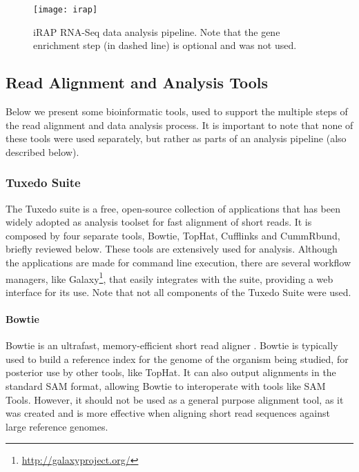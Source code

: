 \begin{figure}[!htb]
  \begin{center}
    \leavevmode
    \texttt{[image: irap]}
    \caption[iRAP RNA-Seq data analysis pipeline]{
      iRAP RNA-Seq data analysis pipeline. Note that the gene enrichment step
      (in dashed line) is optional and was not used.
    }
    \label{fig:irap}
  \end{center}
\end{figure}

\subsection{\rnaseq{} Read Alignment and Analysis Tools}

Below we present some bioinformatic tools, used to support the multiple steps of
the \rnaseq{} read alignment and data analysis process. It is important to note that none of these
tools were used separately, but rather as parts of an analysis pipeline (also
described below).

\subsubsection*{Tuxedo Suite}

The Tuxedo suite is a free, open-source collection of applications that has been
widely adopted as analysis toolset for fast alignment of short reads. It is
composed by four separate tools, Bowtie, TopHat, Cufflinks and CummRbund,
briefly reviewed below. These tools are extensively used for \rnaseq{} analysis.
Although the applications are made for command line execution, there are several
workflow managers, like Galaxy\footnote{\url{http://galaxyproject.org/}}, that
easily integrates with the suite, providing a web interface for its use. Note
that not all components of the Tuxedo Suite were used.

\paragraph{Bowtie}

Bowtie is an ultrafast, memory-efficient short read aligner
\cite{langmead2009ultrafast}. Bowtie is typically used to build a reference
index for the genome of the organism being studied, for posterior use by other
tools, like TopHat. It can also output alignments in the standard SAM format,
allowing Bowtie to interoperate with tools like SAM Tools. However, it should
not be used as a general purpose alignment tool, as it was created and is more
effective when aligning short read sequences against large reference genomes.

